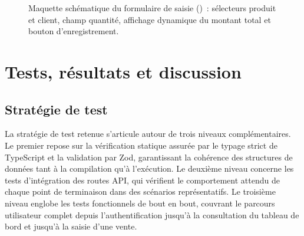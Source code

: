 \documentclass[11pt,a4paper]{report}
\begin{document}
\begin{figure}[H]
\centering
{}
\caption[Maquette du formulaire de saisie d'une vente]{Maquette schématique du
formulaire de saisie ()~: sélecteurs produit et client, champ
quantité, affichage dynamique du montant total et bouton d'enregistrement.}
\label{fig:saleform}
\end{figure}

\chapter{Tests, résultats et discussion}

\section{Stratégie de test}
La stratégie de test retenue s'articule autour de trois niveaux complémentaires.
Le premier repose sur la vérification statique assurée par le typage strict de
TypeScript et la validation par Zod, garantissant la cohérence des structures de
données tant à la compilation qu'à l'exécution. Le deuxième niveau concerne les
tests d'intégration des routes API, qui vérifient le comportement attendu de
chaque point de terminaison dans des scénarios représentatifs. Le troisième
niveau englobe les tests fonctionnels de bout en bout, couvrant le parcours
utilisateur complet depuis l'authentification jusqu'à la consultation du tableau
de bord et jusqu'à la saisie d'une vente.
\end{document}
